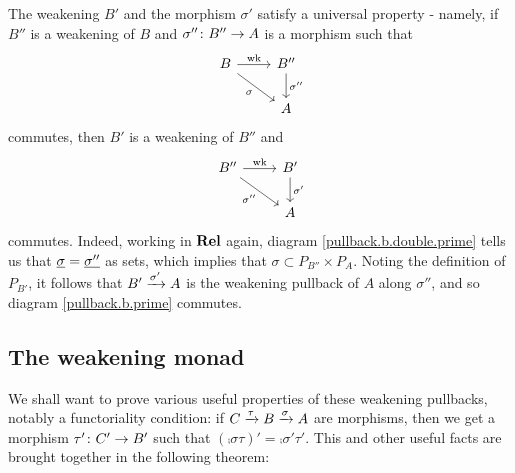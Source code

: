 \documentclass[11pt]{article} %
\begin{document}
The weakening $B'$ and the morphism $\sigma'$ satisfy a universal property - namely, if $B''$ is a weakening of $B$ and $\cmap{\sigma''}{B''}{A}$ is a morphism such that
\begin{equation}
  \label{pullback.b.double.prime}
  \begin{tikzcd}
    B \arrow[r, "\wk"] \arrow[dr, "\sigma"']
      & B'' \arrow[d, "\sigma''"] \\
      & A
  \end{tikzcd}
\end{equation}
commutes, then $B'$ is a weakening of $B''$ and 
\begin{equation}
  \label{pullback.b.prime}
  \begin{tikzcd}
    B'' \arrow[r, "\wk"] \arrow[dr, "\sigma''"']
      & B' \arrow[d, "\sigma'"] \\
      & A
  \end{tikzcd}
\end{equation}
commutes.  Indeed, working in $\Rel$ again, diagram \eqref{pullback.b.double.prime} tells us that $\grel\sigma=\grel{\sigma''}$ as sets, which implies that $\sigma\subset P_{B''}\times P_A$.  Noting the definition of $P_{B'}$, it follows that $\map{\sigma'}{B'}{A}$ is the weakening pullback of $A$ along $\sigma''$, and so diagram \eqref{pullback.b.prime} commutes.

\subsection{The weakening monad}

We shall want to prove various useful properties of these weakening pullbacks, notably a functoriality condition: if $C\xrightarrow{\tau}\map{\sigma}{B}{A}$ are morphisms, then we get a morphism $\cmap{\tau'}{C'}{B'}$ such that $(\comp\sigma\tau)'=\comp{\sigma'}{\tau'}$.  This and other useful facts are brought together in the following theorem:
\end{document}
